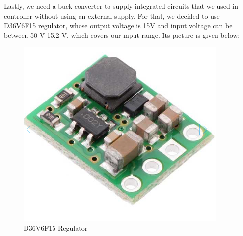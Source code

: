 \documentclass{article}
\newcommand\tab[1][1cm]{\hspace*{#1}}
\begin{document}
\tab Lastly, we need a buck converter to supply integrated circuits that we used in controller without using an external supply. For that, we decided to use D36V6F15 regulator, whose output voltage is 15V and input voltage can be between 50 V-15.2 V, which covers our input range. Its picture is given below:
\begin{figure}[H]
    \centering
    \includegraphics[scale=0.3]{buck.PNG}
    \caption{D36V6F15 Regulator}
    \label{fig:my_label}
\end{figure}
\end{document}
